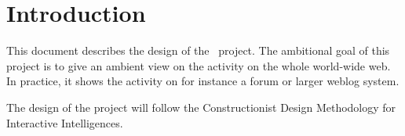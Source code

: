 \chapter{Introduction}

This document describes the design of the \AmbE\ project. The ambitional goal
of this project is to give an ambient view on the activity on the whole
world-wide web. In practice, it shows the activity on for instance a forum or
larger weblog system.

The design of the project will follow the Constructionist Design
Methodology for Interactive Intelligences\cite{CDM}.
